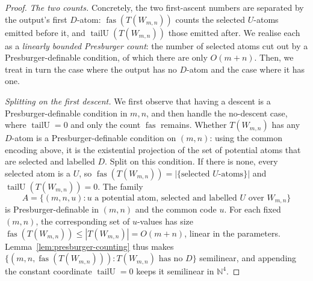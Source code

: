 \documentclass[11pt]{article}
\theoremstyle{definition}
\newcommand{\N}{\mathbb N}
\newcommand{\fas}{\operatorname{fas}}
\newcommand{\tailU}{\operatorname{tailU}}
\begin{document}
\begin{proof}
\vspace{0.5em}
\noindent\emph{The two counts.}  Concretely, the two first-ascent
numbers are separated by the output's first $D$-atom: $\fas(T(W_{m,n}))$ counts
the selected $U$-atoms emitted before it, and $\tailU(T(W_{m,n}))$ those emitted
after.  We realise each as a \emph{linearly bounded Presburger count}: the number
of selected atoms cut out by a Presburger-definable condition, of which there are only
$O(m+n)$.  Then, we treat in turn the case where the output has no $D$-atom and the
case where it has one.

\vspace{0.5em}
\noindent\emph{Splitting on the first descent.}  We first observe that having
a descent is a Presburger-definable condition in $m,n$, and then handle the
no-descent case, where $\tailU=0$ and only the count $\fas$ remains.  Whether $T(W_{m,n})$
has any $D$-atom is a Presburger-definable condition on $(m,n)$: using the
common encoding above, it is the existential projection of the set of
potential atoms that are selected and labelled $D$.  Split on this condition.  If there
is none, every selected atom is a $U$, so
$\fas(T(W_{m,n}))=|\{\text{selected }U\text{-atoms}\}|$ and
$\tailU(T(W_{m,n}))=0$.  The family
\[
   A=\{(m,n,u):u\text{ a potential atom, selected and labelled }U\text{ over }W_{m,n}\}
\]
is Presburger-definable in $(m,n)$ and the common code $u$.  For each fixed
$(m,n)$, the corresponding set of $u$-values has size
$\fas(T(W_{m,n}))\le|T(W_{m,n})|=O(m+n)$, linear in the
parameters.  Lemma~\ref{lem:presburger-counting} thus makes
$\{(m,n,\fas(T(W_{m,n}))):T(W_{m,n})\text{ has no }D\}$ semilinear, and appending
the constant coordinate $\tailU=0$ keeps it semilinear in $\N^4$.


\end{proof}
\end{document}
